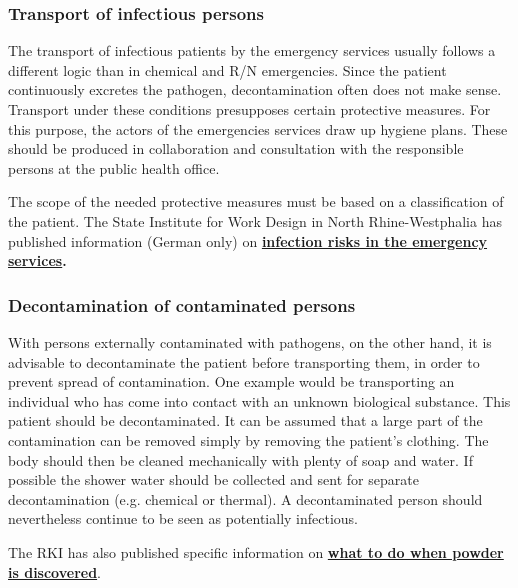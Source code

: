 \documentclass{article}
\begin{document}
\subsubsection{Transport of infectious persons}\label{H3900169}



The transport of infectious patients by the emergency services usually follows a different logic than in chemical and R/N emergencies. Since the patient continuously excretes the pathogen, decontamination often does not make sense. Transport under these conditions presupposes certain protective measures. For this purpose, the actors of the emergencies services draw up hygiene plans. These should be produced in collaboration and consultation with the responsible persons at the public health office.


The scope of the needed protective measures must be based on a classification of the patient. The State Institute for Work Design in North Rhine-Westphalia has published information (German only) on \textbf{\href{https://www.lia.nrw.de/themengebiete/Arbeitsschutz-und-Gesundheit/Biostoffe/Infektionsgefaehrdung-im-Rettungsdienst/index.html}{infection risks in the emergency services}}\textbf{.}


\subsubsection{Decontamination of contaminated persons}\label{H7503243}



With persons externally contaminated with pathogens, on the other hand, it is advisable to decontaminate the patient before transporting them, in order to prevent spread of contamination. One example would be transporting an individual who has come into contact with an unknown biological substance. This patient should be decontaminated. It can be assumed that a large part of the contamination can be removed simply by removing the patient's clothing. The body should then be cleaned mechanically with plenty of soap and water. If possible the shower water should be collected and sent for separate decontamination (e.g. chemical or thermal). A decontaminated person should nevertheless continue to be seen as potentially infectious.


The RKI has also published specific information on \textbf{\href{https://www.rki.de/DE/Content/Infekt/Biosicherheit/Poststellen/Pulverfund.pdf}{what to do when powder is discovered}}.
\end{document}

